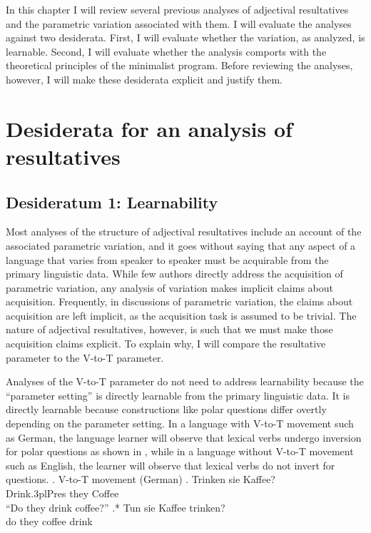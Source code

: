 \documentclass[MilwayThesis]{subfiles}
\begin{document}
In this chapter I will review several previous analyses of adjectival resultatives and the parametric variation associated with them.
I will evaluate the analyses against two desiderata.
First, I will evaluate whether the variation, as analyzed, is learnable.
Second, I will evaluate whether the analysis comports with the theoretical principles of the minimalist program.
Before reviewing the analyses, however, I will make these desiderata explicit and justify them.

\section{Desiderata for an analysis of resultatives}

\subsection{Desideratum 1: Learnability}
Most analyses of the structure of adjectival resultatives include an account of the associated parametric variation, and it goes without saying that any aspect of a language that varies from speaker to speaker must be acquirable from the primary linguistic data.
While few authors directly address the acquisition of parametric variation, any analysis of variation makes implicit claims about acquisition.
Frequently, in discussions of parametric variation, the claims about acquisition are left implicit, as the acquisition task is assumed to be trivial.
The nature of adjectival resultatives, however, is such that we must make those acquisition claims explicit.
To explain why, I will compare the resultative parameter to the V-to-T parameter.

Analyses of the V-to-T parameter do not need to address learnability because the ``parameter setting'' is directly learnable from the primary linguistic data.
It is directly learnable because constructions like polar questions differ overtly depending on the parameter setting.
In a language with V-to-T movement such as German, the language learner will observe that lexical verbs undergo inversion for polar questions as shown in \Next, while in a language without V-to-T movement such as English, the learner will observe that lexical verbs do not invert for questions.
\ex. V-to-T movement (German)
\ag. Trinken sie Kaffee?\\
Drink.3plPres they Coffee\\
``Do they drink coffee?''
\bg.* Tun sie Kaffee trinken?\\
do they coffee drink\\
\end{document}
